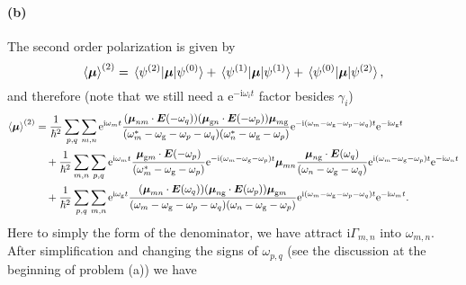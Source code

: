 \documentclass[hyperref, a4paper]{article}
\newcommand*{\ii}{\mathrm{i}}
\newcommand*{\ee}{\mathrm{e}}
\newcommand*{\omegag}{\omega_{\text{g}}}
\begin{document}
\paragraph*{(b)} The second order polarization is given by 
\begin{equation}
    \expval{\vb*{\mu}}^{(2)} = \mel*{\psi^{(2)}}{\vb*{\mu}}{\psi^{(0)}} + 
    \mel*{\psi^{(1)}}{\vb*{\mu}}{\psi^{(1)}}
    + \mel*{\psi^{(0)}}{\vb*{\mu}}{\psi^{(2)}},
\end{equation}
and therefore (note that we still need a $\ee^{- \ii \omega_i t}$ factor 
besides $\gamma_i$)
\begin{equation}
    \begin{aligned}
        \expval{\vb*{\mu}}^{(2)} &= 
        \frac{1}{\hbar^2} \sum_{p, q} \sum_{m, n} \ee^{\ii \omega_m t}
        \frac{
            (\vb*{\mu}_{nm} \cdot \vb*{E}(- \omega_q)) 
            (\vb*{\mu}_{\text{g} n} \cdot \vb*{E}(- \omega_p)) 
            \vb*{\mu}_{m \text{g}}
        }{
            (\omega_m^* - \omegag - \omega_p - \omega_q)
            (\omega_n^* - \omegag - \omega_p)
        } \ee^{- \ii (\omega_m - \omegag - \omega_p - \omega_q) t} 
        \ee^{- \ii \omegag t} \\
        &\quad + \frac{1}{\hbar^2} 
        \sum_{m, n} \sum_{p, q} \ee^{\ii \omega_m t} \frac{\vb*{\mu}_{\text{g} m} \cdot \vb*{E}(- \omega_p)}{(\omega_m^* - \omegag - \omega_p)} 
        \ee^{- \ii (\omega_m - \omegag - \omega_p) t} 
        \vb*{\mu}_{m n} 
        \frac{\vb*{\mu}_{n \text{g}} \cdot \vb*{E}(\omega_q)}{(\omega_n - \omegag - \omega_q)} \ee^{\ii (\omega_m - \omegag - \omega_p) t} \ee^{- \ii \omega_n t}
          \\
        &\quad + 
        \frac{1}{\hbar^2} \sum_{p, q} \sum_{m, n} \ee^{\ii \omegag t}
        \frac{
            (\vb*{\mu}_{mn} \cdot \vb*{E}(\omega_q)) 
            (\vb*{\mu}_{n \text{g}} \cdot \vb*{E}(\omega_p))
            \vb*{\mu}_{\text{g} m}
        }{
            (\omega_m - \omegag - \omega_p - \omega_q)
            (\omega_n - \omegag - \omega_p)
        } \ee^{\ii (\omega_m - \omegag - \omega_p - \omega_q) t} \ee^{- \ii \omega_m t} .
    \end{aligned}
\end{equation}
Here to simply the form of the denominator, 
we have attract $\ii \Gamma_{m, n}$ into $\omega_{m, n}$.
After simplification and changing the signs of $\omega_{p, q}$
(see the discussion at the beginning of problem (a)) we have 
\end{document}
